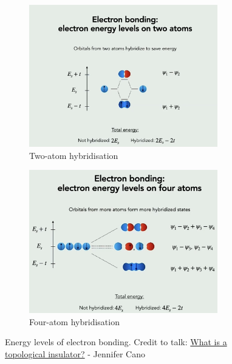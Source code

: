 \documentclass[a4paper]{article}
\begin{document}
    \begin{figure}
        \centering
        \begin{subfigure}[b]{0.45\textwidth}
            \centering
            \includegraphics[width=0.9\textwidth]{hybrid-1.png}
            \caption{Two-atom hybridisation}
        \end{subfigure}
        \hfill
        \begin{subfigure}[b]{0.45\textwidth}
            \centering
            \includegraphics[width=0.9\textwidth]{hybrid-2.png}
            \caption{Four-atom hybridisation}
        \end{subfigure}
        \caption{Energy levels of electron bonding. Credit to talk: \href{https://www.youtube.com/watch?v=YwaF5IC8eBY&ab_channel=KavliInstituteforTheoreticalPhysics}{What is a topological insulator?} - Jennifer Cano}
        \label{fig:electron-bonding-energy}
    \end{figure}
\end{document}
